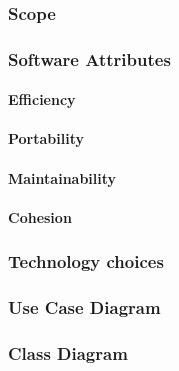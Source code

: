 \subsubsection{Scope}


\subsubsection{Software Attributes}

	\paragraph{Efficiency}
	\paragraph{Portability}
	\paragraph{Maintainability}
	\paragraph{Cohesion}


\subsubsection{Technology choices}

\subsubsection{Use Case Diagram}

\subsubsection{Class Diagram}


